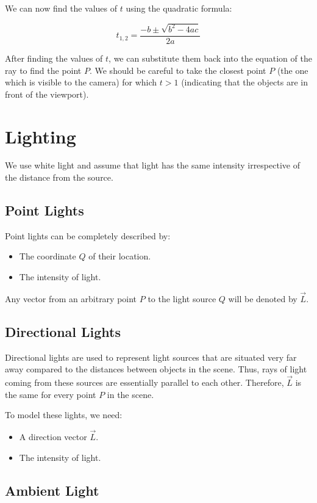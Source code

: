 \documentclass[conference]{IEEEtran}
\begin{document}
We can now find the values of $t$ using the quadratic formula:

$$t_{1,2} = \frac{-b \pm \sqrt{b^2 - 4ac}}{2a}$$

After finding the values of $t$, we can substitute them back into the equation of the ray to find the point $P$. We should be careful to take the closest point $P$ (the one which is visible to the camera) for which $t > 1$ (indicating that the objects are in front of the viewport).

\section{Lighting}

We use white light and assume that light has the same intensity irrespective of the distance from the source.

\subsection{Point Lights}

Point lights can be completely described by:
\begin{itemize}
    \item The coordinate $Q$ of their location.
    \item The intensity of light.
\end{itemize}

Any vector from an arbitrary point $P$ to the light source $Q$ will be denoted by $\vec{L}$.

\subsection{Directional Lights}

Directional lights are used to represent light sources that are situated very far away compared to the distances between objects in the scene. Thus, rays of light coming from these sources are essentially parallel to each other. Therefore, $\vec{L}$ is the same for every point $P$ in the scene.

To model these lights, we need:
\begin{itemize}
    \item A direction vector $\vec{L}$.
    \item The intensity of light.
\end{itemize}

\subsection{Ambient Light}
\end{document}
